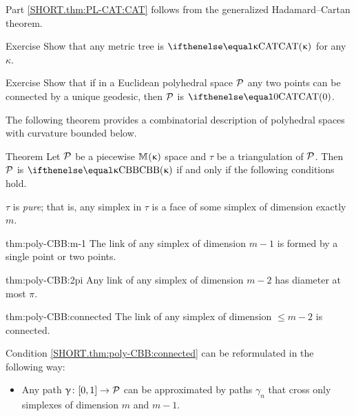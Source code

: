 Part \ref{SHORT.thm:PL-CAT:CAT} follows from the generalized Hadamard--Cartan theorem.
\qeds

\begin{thm}{Exercise}\label{ex:metric tree}
Show that any metric tree is $\CAT\kappa$ for any $\kappa$.
\end{thm}


\begin{thm}{Exercise}\label{ex:poly-unique-geodesic}
Show that if in a Euclidean polyhedral space $\mathcal{P}$
any two points can be connected by a unique geodesic,  
then $\mathcal{P}$ is $\CAT0$.
\end{thm}

The following theorem provides a combinatorial description of polyhedral spaces with curvature bounded below.

\begin{thm}{Theorem}\label{thm:poly-CBB} 
Let $\mathcal{P}$ be a piecewise
$\mathbb{M}_{{}}^{}({\upkappa})$ space and $\tau$ be a triangulation of $\mathcal{P}$.
Then $\mathcal{P}$ is $\Alex\kappa$ if and only if the following conditions hold.

\begin{subthm}{} $\tau$ is \emph{pure}; 
that is, any simplex in $\tau$ is  a face of some simplex of dimension exactly $m$. 
\end{subthm}

\begin{subthm}{thm:poly-CBB:m-1}
The link of any simplex of dimension $m-1$ is formed by a single point or two points.
\end{subthm}

\begin{subthm}{thm:poly-CBB:2pi}
Any link of any simplex of dimension $m-2$
has diameter at most $\pi$.
\end{subthm}

\begin{subthm}{thm:poly-CBB:connected}
The link of any simplex of dimension $\le m-2$ is connected.
\end{subthm}

\end{thm}

Condition \ref{SHORT.thm:poly-CBB:connected}
can be reformulated in the following way:

\begin{itemize}
 \item[\ref{SHORT.thm:poly-CBB:connected}$\,'\!$] 
Any path $\gamma\:[0,1]\to \spc{P}$ can be approximated by paths
$\gamma_n$ 
that cross only simplexes of dimension $m$ and $m-1$.
\end{itemize}

